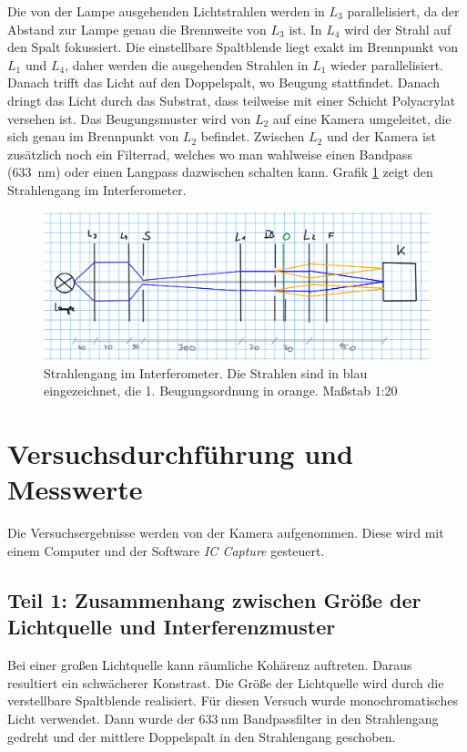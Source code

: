 \documentclass{article}
\begin{document}
Die von der Lampe ausgehenden Lichtstrahlen werden in $L_3$ parallelisiert, da der Abstand zur Lampe genau die Brennweite von $L_3$ ist. In $L_4$ wird der Strahl auf den Spalt fokussiert. Die einstellbare Spaltblende liegt exakt im Brennpunkt von $L_1$ und $L_4$, daher werden die ausgehenden Strahlen in $L_1$ wieder parallelisiert. Danach trifft das Licht auf den Doppelspalt, wo Beugung stattfindet. Danach dringt das Licht durch das Substrat, dass teilweise mit einer Schicht Polyacrylat versehen ist. Das Beugungsmuster wird von $L_2$ auf eine Kamera umgeleitet, die sich genau im Brennpunkt von $L_2$ befindet. Zwischen $L_2$ und der Kamera ist zusätzlich noch ein Filterrad, welches wo man wahlweise einen Bandpass (633~nm) oder einen Langpass dazwischen schalten kann. Grafik \ref{fig:strahlen} zeigt den Strahlengang im Interferometer. 

\begin{figure}[H]
\caption{Strahlengang im Interferometer. Die Strahlen sind in blau eingezeichnet, die 1. Beugungsordnung in orange. Maßstab 1:20}
\label{fig:strahlen}
\includegraphics[scale=1]{strahlen.png}
\end{figure}



\section{Versuchsdurchführung und Messwerte}

Die Versuchsergebnisse werden von der Kamera aufgenommen. Diese wird mit einem Computer und der Software \textit{IC Capture} gesteuert.


\subsection{Teil 1: Zusammenhang zwischen Größe der Lichtquelle und Interferenzmuster}

Bei einer großen Lichtquelle kann räumliche Kohärenz auftreten. Daraus resultiert ein schwächerer Konstrast. Die Größe der Lichtquelle wird durch die verstellbare Spaltblende realisiert. Für diesen Versuch wurde monochromatisches Licht verwendet. Dann wurde der $633~$nm Bandpassfilter in den Strahlengang gedreht und der mittlere Doppelspalt in den Strahlengang geschoben.
\end{document}
